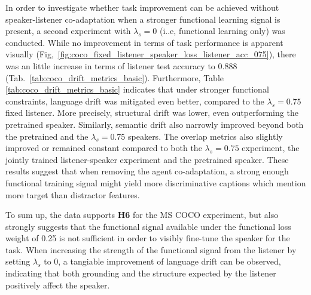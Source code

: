 In order to investigate whether task improvement can be achieved without speaker-listener co-adaptation when a stronger functional learning signal is present, a second experiment with $\lambda_s=0$ (i..e, functional learning only) was conducted. While no improvement in terms of task performance is apparent visually (Fig,~\ref{fig:coco_fixed_listener_speaker_loss_listener_acc_075}), there was an little increase in terms of listener test accuracy to 0.888 (Tab.~\ref{tab:coco_drift_metrics_basic}). Furthermore, Table \ref{tab:coco_drift_metrics_basic} indicates that under stronger functional constraints, language drift was mitigated even better, compared to the $\lambda_s = 0.75$ fixed listener. More precisely, structural drift was lower, even outperforming the pretrained speaker. Similarly, semantic drift also narrowly improved beyond both the pretrained and the $\lambda_s = 0.75$ speakers. 
The overlap metrics also slightly improved or remained constant compared to both the $\lambda_s=0.75$ experiment, the jointly trained listener-speaker experiment and the pretrained speaker. These results suggest that when removing the agent co-adaptation, a strong enough functional training signal might yield more discriminative captions which mention more target than distractor features. 

To sum up, the data supports \textbf{H6} for the MS COCO experiment, but also strongly suggests that the functional signal available under the functional loss weight of 0.25 is not sufficient in order to visibly fine-tune the speaker for the task. When increasing the strength of the functional signal from the listener by setting $\lambda_s$ to 0, a tangiable improvement of language drift can be observed, indicating that both grounding and the structure expected by the listener positively affect the speaker.

